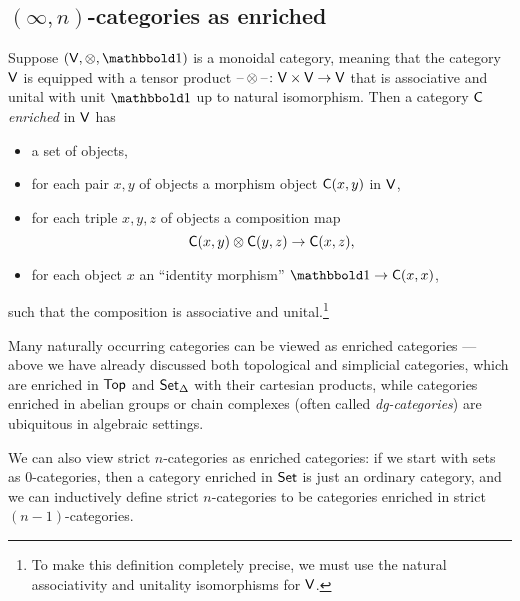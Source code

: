 \documentclass[a4paper,11pt]{article}
\renewcommand{\Top}{\catname{Top}}
\begin{document}
\subsection{$(\infty,n)$-categories as enriched \icats{}}\label{subsec:enr}
Suppose $(\uV, \otimes, \bbone)$ is a monoidal category, meaning that
the category $\textup{\textsf{V}}$ is equipped with
a tensor product $\blank \otimes \blank \colon \uV \times \uV \to \uV$
that is associative and unital with unit $\bbone$ up to natural
isomorphism. Then a category $\textup{\textsf{C}}$ \emph{enriched} in $\textup{\textsf{V}}$ has
\begin{itemize}
\item a set of objects,
\item for each pair $x,y$ of objects a morphism object $\textup{\textsf{C}}(x,y)$ in
  $\textup{\textsf{V}}$,
\item for each triple $x,y,z$ of objects a composition map
  \[ \uC(x,y) \otimes \uC(y,z) \to \uC(x,z), \]
\item for each object $x$ an ``identity morphism'' $\bbone \to
  \uC(x,x)$,
\end{itemize}
such that the composition is associative and unital.\footnote{To make
  this definition completely precise, we must use the natural associativity and
  unitality isomorphisms for $\textup{\textsf{V}}$.}

Many naturally occurring categories can be viewed as enriched
categories --- above we have already discussed both topological and
simplicial categories, which are enriched in $\Top$ and $\textup{\textsf{Set}}_{\Delta}$ with
their cartesian products, while categories enriched in abelian groups
or chain complexes (often called \emph{dg-categories}) are ubiquitous
in algebraic settings.

We can
also view strict $n$-categories as enriched categories: if we start
with sets as $0$-categories, then a category enriched in $\textup{\textsf{Set}}$ is
just an ordinary category, and we can inductively define strict
$n$-categories to be categories enriched in strict $(n-1)$-categories.
\end{document}

